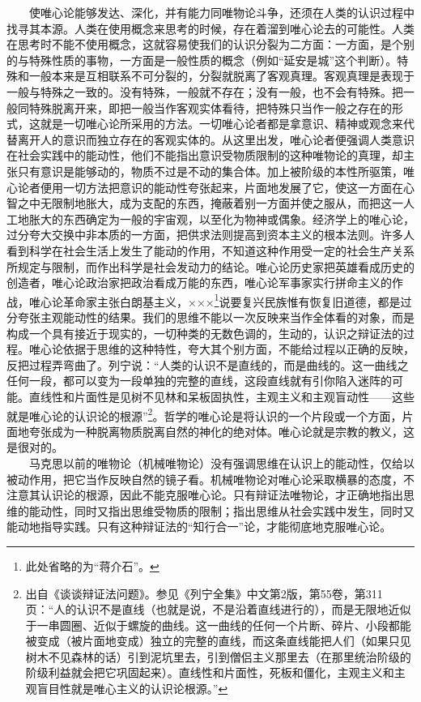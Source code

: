 \documentclass[cn,11pt,chinese]{elegantbook}
\begin{document}
　　使唯心论能够发达、深化，并有能力同唯物论斗争，还须在人类的认识过程中找寻其本源。人类在使用概念来思考的时候，存在着溜到唯心论去的可能性。人类在思考时不能不使用概念，这就容易使我们的认识分裂为二方面：一方面，是个别的与特殊性质的事物，一方面是一般性质的概念（例如“延安是城”这个判断）。特殊和一般本来是互相联系不可分裂的，分裂就脱离了客观真理。客观真理是表现于一般与特殊之一致的。没有特殊，一般就不存在；没有一般，也不会有特殊。把一般同特殊脱离开来，即把一般当作客观实体看待，把特殊只当作一般之存在的形式，这就是一切唯心论所采用的方法。一切唯心论者都是拿意识、精神或观念来代替离开人的意识而独立存在的客观实体的。从这里出发，唯心论者便强调人类意识在社会实践中的能动性，他们不能指出意识受物质限制的这种唯物论的真理，却主张只有意识是能够动的，物质不过是不动的集合体。加上被阶级的本性所驱策，唯心论者便用一切方法把意识的能动性夸张起来，片面地发展了它，使这一方面在心智之中无限制地胀大，成为支配的东西，掩蔽着别一方面并使之服从，而把这一人工地胀大的东西确定为一般的宇宙观，以至化为物神或偶象。经济学上的唯心论，过分夸大交换中非本质的一方面，把供求法则提高到资本主义的根本法则。许多人看到科学在社会生活上发生了能动的作用，不知道这种作用受一定的社会生产关系所规定与限制，而作出科学是社会发动力的结论。唯心论历史家把英雄看成历史的创造者，唯心论政治家把政治看成万能的东西，唯心论军事家实行拼命主义的作战，唯心论革命家主张白朗基主义，×××\footnote[1]{ 此处省略的为“蒋介石”。}说要复兴民族惟有恢复旧道德，都是过分夸张主观能动性的结果。我们的思维不能以一次反映来当作全体看的对象，而是构成一个具有接近于现实的，一切种类的无数色调的，生动的，认识之辩证法的过程。唯心论依据于思维的这种特性，夸大其个别方面，不能给过程以正确的反映，反把过程弄弯曲了。列宁说：“人类的认识不是直线的，而是曲线的。这一曲线之任何一段，都可以变为一段单独的完整的直线，这段直线就有引你陷入迷阵的可能。直线性和片面性是见树不见林和呆板固执性，主观主义和主观盲动性——这些就是唯心论的认识论的根源”\footnote[2]{ 出自《谈谈辩证法问题》。参见《列宁全集》中文第2版，第55卷，第311页：“人的认识不是直线（也就是说，不是沿着直线进行的），而是无限地近似于一串圆圈、近似于螺旋的曲线。这一曲线的任何一个片断、碎片、小段都能被变成（被片面地变成）独立的完整的直线，而这条直线能把人们（如果只见树木不见森林的话）引到泥坑里去，引到僧侣主义那里去（在那里统治阶级的阶级利益就会把它巩固起来）。直线性和片面性，死板和僵化，主观主义和主观盲目性就是唯心主义的认识论根源。”}。哲学的唯心论是将认识的一个片段或一个方面，片面地夸张成为一种脱离物质脱离自然的神化的绝对体。唯心论就是宗教的教义，这是很对的。\\
　　马克思以前的唯物论（机械唯物论）没有强调思维在认识上的能动性，仅给以被动作用，把它当作反映自然的镜子看。机械唯物论对唯心论采取横暴的态度，不注意其认识论的根源，因此不能克服唯心论。只有辩证法唯物论，才正确地指出思维的能动性，同时又指出思维受物质的限制；指出思维从社会实践中发生，同时又能动地指导实践。只有这种辩证法的“知行合一”论，才能彻底地克服唯心论。\\
\end{document}
